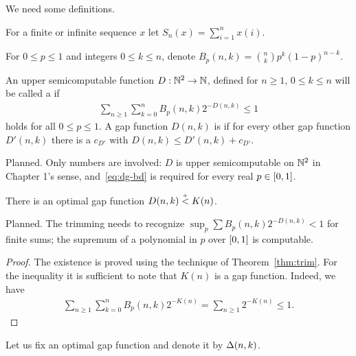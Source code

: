 We need some definitions.

\begin{definition}
  \label{def:g4.6.9}
For a finite or infinite sequence \( x \) let \( S_{n}(x)=\sum_{i=1}^{n}x(i) \).

For \( 0\le p\le 1 \) and integers \( 0\le k\le n \), 
denote \( B_{p}(n,k)=\binom{n}{k}p^{k}(1-p)^{n-k} \).

An upper semicomputable function \( D:\mathbb{N}^{2}\to\mathbb{N} \), defined for \( n\ge 1 \),
\( 0\le k\le n \) will be called a  if
 \begin{align}\label{eq:dg-bd}
  \sum_{n\ge 1}\sum_{k=0}^{n}B_{p}(n,k)2^{-D(n,k)} \le 1
 \end{align}
holds for all \( 0\le p\le 1 \).
A gap function \( D(n,k) \) is  if for every other gap 
function \( D'(n,k) \) there is a \( c_{D'} \) with \( D(n,k)\le D'(n,k)+c_{D'} \).
\end{definition}

\begin{formalization}
Planned. Only numbers are involved: $D$ is upper semicomputable on $\mathbb{N}^{2}$ in Chapter 1's sense,
and~\eqref{eq:dg-bd} is required for every real $p\in[0,1]$.
\end{formalization}

 \begin{proposition}
  \label{prop:g4.6.10}
There is an optimal gap function \( D(n,k)\stackrel{{}_+}{<} K(n) \).
 \end{proposition}

\begin{formalization}
Planned. The trimming needs to recognize $\sup_{p}\sum B_{p}(n,k)2^{-D(n,k)}<1$ for finite sums;
the supremum of a polynomial in $p$ over $[0,1]$ is computable.
\end{formalization}
 \begin{proof}
The existence is proved using the technique of Theorem~\ref{thm:trim}.
For the inequality it is sufficient to note that \( K(n) \) is a gap function.
Indeed, we have
 \begin{align*}
  \sum_{n\ge 1}\sum_{k=0}^{n}B_{p}(n,k)2^{-K(n)} =\sum_{n\ge 1}2^{-K(n)}\le 1.
 \end{align*}
 \end{proof}

\begin{definition}
  \label{def:g4.6.11}
Let us fix an optimal gap function and denote it by \( \Delta(n,k) \).
\end{definition}

